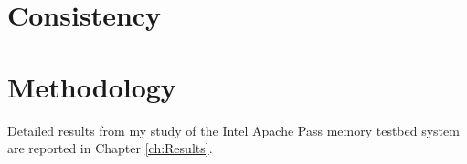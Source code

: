 \section{Consistency}\label{section:model:consistency}

\cite{adve1996shared}

\section{Methodology}\label{section:model:methodology}

Detailed results from my study of the Intel Apache Pass memory testbed system are reported in Chapter \ref{ch:Results}.
